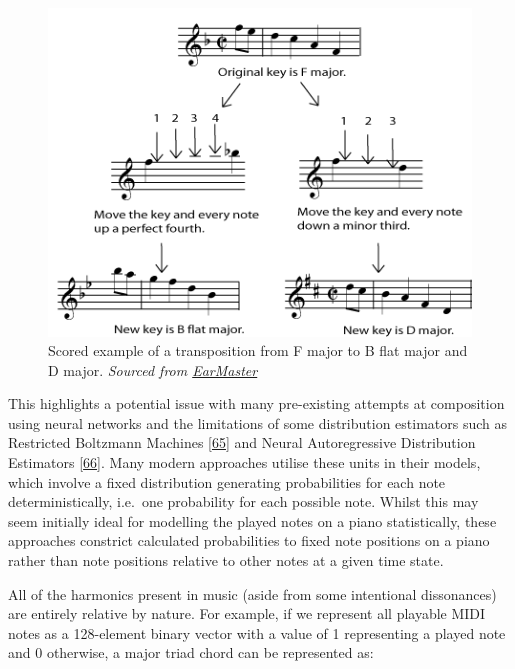 \documentclass[12pt,]{article}
\begin{document}
\begin{figure}
\centering
\includegraphics[width=\textwidth,height=0.3\textheight]{Images/transp3b.png}
\caption{Scored example of a transposition from F major to B flat major
and D major.
\newline\textit{Sourced from \href{https://www.earmaster.com/music-theory-online/ch06/chapter-6-4.html}{EarMaster}}}
\end{figure}

This highlights a potential issue with many pre-existing attempts at
composition using neural networks and the limitations of some
distribution estimators such as Restricted Boltzmann Machines
{[}\protect\hyperlink{ref-sutskever2009recurrent}{65}{]} and Neural
Autoregressive Distribution Estimators
{[}\protect\hyperlink{ref-uria2016neural}{66}{]}. Many modern approaches
utilise these units in their models, which involve a fixed distribution
generating probabilities for each note deterministically, i.e.~one
probability for each possible note. Whilst this may seem initially ideal
for modelling the played notes on a piano statistically, these
approaches constrict calculated probabilities to fixed note positions on
a piano rather than note positions relative to other notes at a given
time state.

All of the harmonics present in music (aside from some intentional
dissonances) are entirely relative by nature. For example, if we
represent all playable MIDI notes as a 128-element binary vector with a
value of 1 representing a played note and 0 otherwise, a major triad
chord can be represented as:
\end{document}

